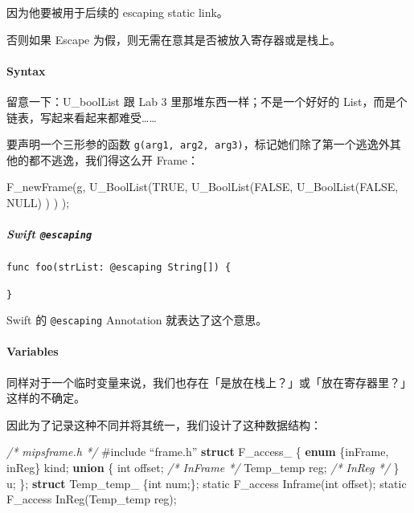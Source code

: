 \documentclass[
]{article}
\newenvironment{Shaded}{}{}
\newcommand{\AttributeTok}[1]{\textcolor[rgb]{0.49,0.56,0.16}{#1}}
\newcommand{\CommentTok}[1]{\textcolor[rgb]{0.38,0.63,0.69}{\textit{#1}}}
\newcommand{\DataTypeTok}[1]{\textcolor[rgb]{0.56,0.13,0.00}{#1}}
\newcommand{\KeywordTok}[1]{\textcolor[rgb]{0.00,0.44,0.13}{\textbf{#1}}}
\newcommand{\NormalTok}[1]{#1}
\newcommand{\PreprocessorTok}[1]{\textcolor[rgb]{0.74,0.48,0.00}{#1}}
\begin{document}
因为他要被用于后续的 escaping static link。

否则如果 Escape 为假，则无需在意其是否被放入寄存器或是栈上。

\hypertarget{header-n46}{%
\paragraph{Syntax}\label{header-n46}}

留意一下：U\_boolList 跟 Lab 3 里那堆东西一样；不是一个好好的
List，而是个链表，写起来看起来都难受\ldots\ldots{}

要声明一个三形参的函数
\texttt{g(arg1,\ arg2,\ arg3)}，标记她们除了第一个逃逸外其他的都不逃逸，我们得这么开
Frame：

\begin{Shaded}
\begin{Highlighting}[]
\NormalTok{F_newFrame(g, }
\NormalTok{	U_BoolList(TRUE,}
\NormalTok{		U_BoolList(FALSE,}
\NormalTok{			U_BoolList(FALSE, NULL)}
\NormalTok{		)}
\NormalTok{	)}
\NormalTok{);}
\end{Highlighting}
\end{Shaded}

\hypertarget{header-n50}{%
\subparagraph{\texorpdfstring{Swift
\texttt{@escaping}}{Swift @escaping}}\label{header-n50}}

\begin{verbatim}
func foo(strList: @escaping String[]) {
    
}
\end{verbatim}

Swift 的 \texttt{@escaping} Annotation 就表达了这个意思。

\hypertarget{header-n53}{%
\paragraph{Variables}\label{header-n53}}

同样对于一个临时变量来说，我们也存在「是放在栈上？」或「放在寄存器里？」这样的不确定。

因此为了记录这种不同并将其统一，我们设计了这种数据结构：

\begin{Shaded}
\begin{Highlighting}[]
\CommentTok{/* mipsframe.h */}
\PreprocessorTok{#include “frame.h”}
\KeywordTok{struct}\NormalTok{ F_access_ \{}
	\KeywordTok{enum}\NormalTok{ \{inFrame, inReg\} kind;}
	\KeywordTok{union}\NormalTok{ \{}
		\DataTypeTok{int}\NormalTok{ offset;			}\CommentTok{/* InFrame */}
\NormalTok{		Temp_temp reg;		}\CommentTok{/* InReg */}
\NormalTok{	\} u;}
\NormalTok{\};}
\KeywordTok{struct}\NormalTok{ Temp_temp_ \{}\DataTypeTok{int}\NormalTok{ num;\};}
\AttributeTok{static}\NormalTok{ F_access Inframe(}\DataTypeTok{int}\NormalTok{ offset);}
\AttributeTok{static}\NormalTok{ F_access InReg(Temp_temp reg);}
\end{Highlighting}
\end{Shaded}
\end{document}
